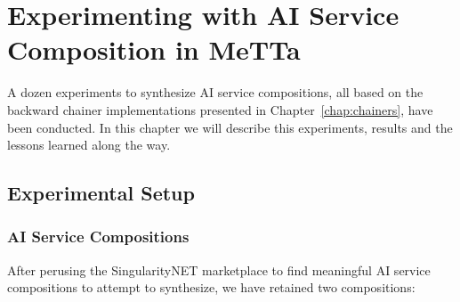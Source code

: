 \documentclass[]{report}
\begin{document}
\chapter{Experimenting with AI Service Composition in MeTTa}
\label{chap:xpaicompo}
A dozen experiments to synthesize AI service compositions, all based
on the backward chainer implementations presented in
Chapter~\ref{chap:chainers}, have been conducted.  In this chapter we
will describe this experiments, results and the lessons learned along
the way.

\section{Experimental Setup}
\label{sec:xpsetup}

\subsection{AI Service Compositions}
\label{sec:aicomp}
After perusing the SingularityNET marketplace to find meaningful AI
service compositions to attempt to synthesize, we have retained two
compositions:
\end{document}
